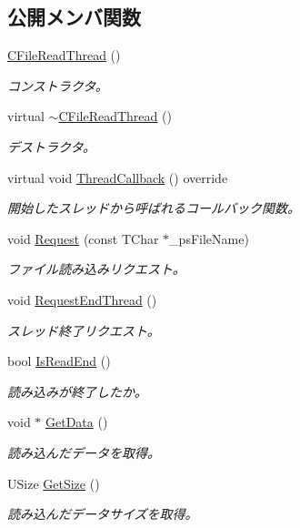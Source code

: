 \subsection*{公開メンバ関数}
\begin{DoxyCompactItemize}
\item 
\hyperlink{class_c_file_read_thread_a6be058890450e1457324d738a42324e8}{C\+File\+Read\+Thread} ()
\begin{DoxyCompactList}\small\item\em コンストラクタ。 \end{DoxyCompactList}\item 
virtual \hyperlink{class_c_file_read_thread_a249a969dafa6aa1fb98b87098f3d9f22}{$\sim$\+C\+File\+Read\+Thread} ()
\begin{DoxyCompactList}\small\item\em デストラクタ。 \end{DoxyCompactList}\item 
virtual void \hyperlink{class_c_file_read_thread_a74368d5091a88e1ad149e35a09fba026}{Thread\+Callback} () override
\begin{DoxyCompactList}\small\item\em 開始したスレッドから呼ばれるコールバック関数。 \end{DoxyCompactList}\item 
void \hyperlink{class_c_file_read_thread_a93688d92c0a249522ab133a4de08b727}{Request} (const T\+Char $\ast$\+\_\+ps\+File\+Name)
\begin{DoxyCompactList}\small\item\em ファイル読み込みリクエスト。 \end{DoxyCompactList}\item 
void \hyperlink{class_c_file_read_thread_a36a83980898059b75c22fb0e9fba9b8c}{Request\+End\+Thread} ()
\begin{DoxyCompactList}\small\item\em スレッド終了リクエスト。 \end{DoxyCompactList}\item 
bool \hyperlink{class_c_file_read_thread_a67df23cd8c25bb51a414838353576c6c}{Is\+Read\+End} ()
\begin{DoxyCompactList}\small\item\em 読み込みが終了したか。 \end{DoxyCompactList}\item 
void $\ast$ \hyperlink{class_c_file_read_thread_a13d5df9d60ab84216882cd4791b88f46}{Get\+Data} ()
\begin{DoxyCompactList}\small\item\em 読み込んだデータを取得。 \end{DoxyCompactList}\item 
U\+Size \hyperlink{class_c_file_read_thread_ae89ecd3f84e68aa48eea6f3ed787484c}{Get\+Size} ()
\begin{DoxyCompactList}\small\item\em 読み込んだデータサイズを取得。 \end{DoxyCompactList}\end{DoxyCompactItemize}
